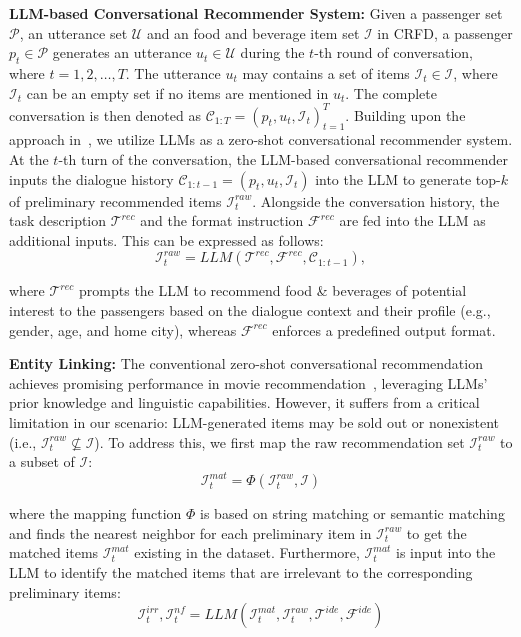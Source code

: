 \documentclass[runningheads]{llncs}
\begin{document}
\textbf{LLM-based Conversational Recommender System:} Given a passenger set $\mathcal{P}$, an utterance set $\mathcal{U}$ and an food and beverage item set $\mathcal{I}$ in CRFD, a passenger $p_t \in \mathcal{P}$ generates an utterance $u_t \in \mathcal{U}$ during the $t$-th round of conversation, where $t = 1, 2, \dots, T$.
The utterance $u_t$ may contains a set of items $\mathcal{I}_t \in \mathcal{I}$, where $\mathcal{I}_t$ can be an empty set if no items are mentioned in $u_t$.
The complete conversation is then denoted as $\mathcal{C}_{1:T} = (p_t, u_t, \mathcal{I}_t)_{t=1}^T$.
Building upon the approach in~\cite{zeroshot-crs}, we utilize LLMs as a zero-shot conversational recommender system.
At the $t$-th turn of the conversation, the LLM-based conversational recommender inputs the dialogue history $\mathcal{C}_{1:t-1} = (p_t, u_t, \mathcal{I}_t)$ into the LLM to generate top-$k$ of preliminary recommended items $\mathcal{I}_{t}^{raw}$.
Alongside the conversation history, the task description $\mathcal{T}^{rec}$ and the format instruction $\mathcal{F}^{rec}$ are fed into the LLM as additional inputs. 
This can be expressed as follows:
\begin{equation}
    \mathcal{I}_{t}^{raw}=LLM(\mathcal{T}^{rec},\mathcal{F}^{rec},\mathcal{C}_{1:t-1}),
    \label{eq_LLM_recommend}
\end{equation}

\noindent where $\mathcal{T}^{rec}$ prompts the LLM to recommend food \& beverages of potential interest to the passengers based on the dialogue context and their profile (e.g., gender, age, and home city), whereas $\mathcal{F}^{rec}$ enforces a predefined output format.


\indent \textbf{Entity Linking:} The conventional zero-shot conversational recommendation achieves promising performance in movie recommendation~\cite{zeroshot-crs}, leveraging LLMs' prior knowledge and linguistic capabilities. 
However, it suffers from a critical limitation in our scenario: LLM-generated items may be sold out or nonexistent (i.e., $\mathcal{I}_{t}^{raw} \nsubseteq \mathcal{I}$). 
To address this, we first map the raw recommendation set $\mathcal{I}_{t}^{raw}$ to a subset of $\mathcal{I}$:
\begin{equation}
    \mathcal{I}_{t}^{mat}= \Phi(\mathcal{I}_{t}^{raw}, \mathcal{I})
    \label{eq_entity_linking}
\end{equation}

\noindent where the mapping function $\Phi$ is based on string matching or semantic matching and finds the nearest neighbor for each preliminary item in $\mathcal{I}^{raw}_{t}$ to get the matched items $\mathcal{I}_{t}^{mat}$ existing in the dataset.
Furthermore, $\mathcal{I}_{t}^{mat}$ is input into the LLM to identify the matched items that are irrelevant to the corresponding preliminary items:
\begin{equation}
    \mathcal{I}^{irr}_{t}, \mathcal{I}_{t}^{nf} = LLM(\mathcal{I}_{t}^{mat}, \mathcal{I}_{t}^{raw}, \mathcal{T}^{ide}, \mathcal{F}^{ide})
    \label{eq_remove_irrelevant}
\end{equation}
\end{document}
